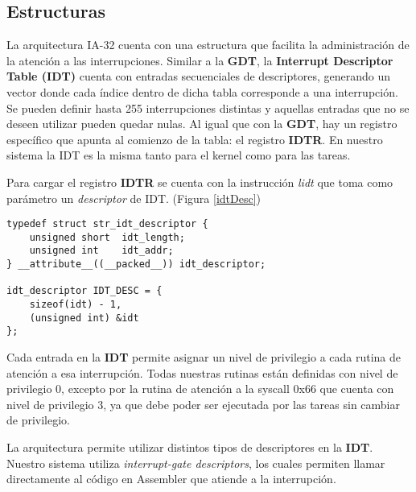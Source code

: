 \documentclass[a4paper]{article}
\begin{document}
\subsection{Estructuras}
La arquitectura IA-32 cuenta con una estructura que facilita la administración de la atención a las interrupciones. Similar a la \textbf{GDT}, la \textbf{Interrupt Descriptor Table (IDT)} cuenta con entradas secuenciales de descriptores, generando un vector donde cada índice dentro de dicha tabla corresponde a una interrupción. Se pueden definir hasta 255 interrupciones distintas y aquellas entradas que no se deseen utilizar pueden quedar nulas. Al igual que con la \textbf{GDT}, hay un registro específico que apunta al comienzo de la tabla: el registro \textbf{IDTR}. En nuestro sistema la IDT es la misma tanto para el kernel como para las tareas.

Para cargar el registro \textbf{IDTR} se cuenta con la instrucción \textit{lidt} que toma como parámetro un \textit{descriptor} de IDT. (Figura \ref{idtDesc})

\begin{lstlisting}[caption={Descriptor de IDT -- \textbf{idt.\{c,h\}}}, label=idtDesc]
typedef struct str_idt_descriptor {
    unsigned short  idt_length;
    unsigned int    idt_addr;
} __attribute__((__packed__)) idt_descriptor;

idt_descriptor IDT_DESC = {
    sizeof(idt) - 1,
    (unsigned int) &idt
};
\end{lstlisting}

Cada entrada en la \textbf{IDT} permite asignar un nivel de privilegio a cada rutina de atención a esa interrupción. Todas nuestras rutinas están definidas con nivel de privilegio 0, excepto por la rutina de atención a la syscall 0x66 que cuenta con nivel de privilegio 3, ya que debe poder ser ejecutada por las tareas sin cambiar de privilegio.

La arquitectura permite utilizar distintos tipos de descriptores en la \textbf{IDT}. Nuestro sistema utiliza \textit{interrupt-gate descriptors}, los cuales permiten llamar directamente al código en Assembler que atiende a la interrupción.
\end{document}

